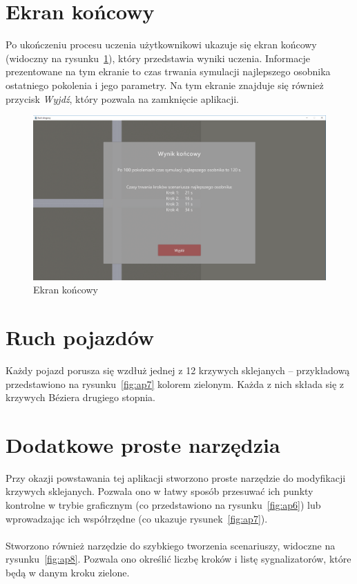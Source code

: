 \section*{Ekran końcowy}
Po ukończeniu procesu uczenia użytkownikowi ukazuje się ekran końcowy (widoczny na rysunku~\ref{fig:ap9}), który przedstawia wyniki uczenia. Informacje prezentowane na tym ekranie to czas trwania symulacji najlepszego osobnika ostatniego pokolenia i jego parametry. Na tym ekranie znajduje się również przycisk \textit{Wyjdź}, który pozwala na zamknięcie aplikacji.
\begin{figure}
	\centering
	\includegraphics[width=1\linewidth]{ap9}
	\caption[Ekran końcowy]{Ekran końcowy}
	\label{fig:ap9}
\end{figure}

\section*{Ruch pojazdów}
Każdy pojazd porusza się wzdłuż jednej z 12 krzywych sklejanych -- przykładową przedstawiono na rysunku~\ref{fig:ap7} kolorem zielonym. Każda z nich składa się z krzywych Béziera drugiego stopnia.
\section*{Dodatkowe proste narzędzia}Przy okazji powstawania tej aplikacji stworzono proste narzędzie do modyfikacji krzywych sklejanych. Pozwala ono w łatwy sposób przesuwać ich punkty kontrolne w trybie graficznym (co przedstawiono na rysunku~\ref{fig:ap6}) lub wprowadzając ich współrzędne (co ukazuje rysunek~\ref{fig:ap7}).
\paragraph{}Stworzono również narzędzie do szybkiego tworzenia scenariuszy, widoczne na rysunku~\ref{fig:ap8}. Pozwala ono określić liczbę kroków i listę sygnalizatorów, które będą w danym kroku zielone.
